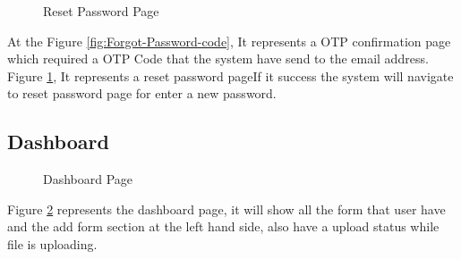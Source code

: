 \documentclass[12pt,oneside,openright,a4paper]{cpe-english-project}
\begin{document}
\begin{figure}[!h]
\centering
{}
\caption{Reset Password Page}\label{fig:Reset Password}
\end{figure}



At the Figure \ref{fig:Forgot-Password-code}, It represents a OTP confirmation page which required a OTP Code that the system have send to the email address. Figure \ref{fig:Reset Password}, It represents a reset password pageIf it success the system will navigate to reset password page for enter a new password.

\newpage
\subsection{Dashboard}

\begin{figure}[!h]
\centering
{}
\caption{Dashboard Page}\label{fig:Dashboard}
\end{figure}

Figure \ref{fig:Dashboard} represents the dashboard page, it will show all the form that user have and the add form section at the left hand side, also have a upload status while file is uploading.
\end{document}
